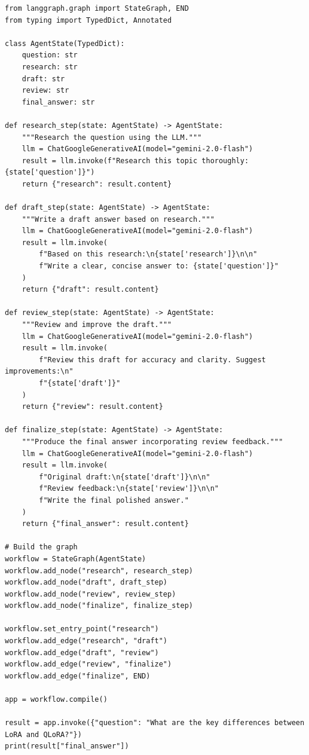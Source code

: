 \begin{verbatim}
from langgraph.graph import StateGraph, END
from typing import TypedDict, Annotated

class AgentState(TypedDict):
    question: str
    research: str
    draft: str
    review: str
    final_answer: str

def research_step(state: AgentState) -> AgentState:
    """Research the question using the LLM."""
    llm = ChatGoogleGenerativeAI(model="gemini-2.0-flash")
    result = llm.invoke(f"Research this topic thoroughly: {state['question']}")
    return {"research": result.content}

def draft_step(state: AgentState) -> AgentState:
    """Write a draft answer based on research."""
    llm = ChatGoogleGenerativeAI(model="gemini-2.0-flash")
    result = llm.invoke(
        f"Based on this research:\n{state['research']}\n\n"
        f"Write a clear, concise answer to: {state['question']}"
    )
    return {"draft": result.content}

def review_step(state: AgentState) -> AgentState:
    """Review and improve the draft."""
    llm = ChatGoogleGenerativeAI(model="gemini-2.0-flash")
    result = llm.invoke(
        f"Review this draft for accuracy and clarity. Suggest improvements:\n"
        f"{state['draft']}"
    )
    return {"review": result.content}

def finalize_step(state: AgentState) -> AgentState:
    """Produce the final answer incorporating review feedback."""
    llm = ChatGoogleGenerativeAI(model="gemini-2.0-flash")
    result = llm.invoke(
        f"Original draft:\n{state['draft']}\n\n"
        f"Review feedback:\n{state['review']}\n\n"
        f"Write the final polished answer."
    )
    return {"final_answer": result.content}

# Build the graph
workflow = StateGraph(AgentState)
workflow.add_node("research", research_step)
workflow.add_node("draft", draft_step)
workflow.add_node("review", review_step)
workflow.add_node("finalize", finalize_step)

workflow.set_entry_point("research")
workflow.add_edge("research", "draft")
workflow.add_edge("draft", "review")
workflow.add_edge("review", "finalize")
workflow.add_edge("finalize", END)

app = workflow.compile()

result = app.invoke({"question": "What are the key differences between LoRA and QLoRA?"})
print(result["final_answer"])
\end{verbatim}

